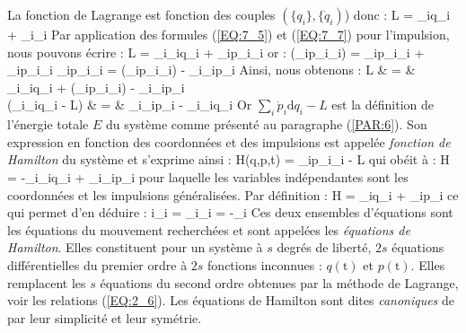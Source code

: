 La fonction de Lagrange est fonction des couples $(\{q_{i}\},\{\dot{q}_{i})$) donc :
\benn
	L = \sum_{i}q_{i} + \sum_{i}_{i}
\eenn
Par application des formules (\ref{EQ:7_5}) et (\ref{EQ:7_7}) pour l'impulsion, nous pouvons \'{e}crire :
\be
	L = \sum_{i}_{i}q_{i} + \sum_{i}p_{i}_{i} \label{EQ:40_1}
\ee
or :
\benn
	\left(\sum_{i}p_{i}_{i}\right) = \sum_{i}p_{i}_{i} + \sum_{i}p_{i}_{i} \Leftrightarrow \sum_{i}p_{i}_{i} = \left(\sum_{i}p_{i}_{i}\right) - \sum_{i}_{i}p_{i}
\eenn
Ainsi, nous obtenons :
\bea
	L & = & \sum_{i}_{i}q_{i} + \left(\sum_{i}p_{i}_{i}\right) - \sum_{i}_{i}p_{i} \nonumber \\
	\Leftrightarrow {}\left(\sum_{i}_{i}q_{i} - L\right) & = & \sum_{i}_{i}p_{i} - \sum_{i}_{i}q_{i} \nonumber
\eea
Or $\sum_{i}\dot{p}_{i}\mathrm{d}q_{i} - L$ est la d\'{e}finition de l'\'{e}nergie totale $E$ du syst\`{e}me comme pr\'{e}sent\'{e} au paragraphe (\ref{PAR:6}). Son expression en fonction des coordonn\'{e}es et des impulsions est appel\'{e}e \emph{fonction de Hamilton} du syst\`{e}me et s'exprime ainsi :
\be
	H(q,p,t) = \sum_{i}p_{i}_{i} - L \label{EQ:40_2}
\ee
qui ob\'{e}it \`{a} :
\be
	H = -\sum_{i}_{i}q_{i} + \sum_{i}_{i}p_{i} \label{EQ:40_3}
\ee
pour laquelle les variables ind\'{e}pendantes sont les coordonn\'{e}es et les impulsions g\'{e}n\'{e}ralis\'{e}es. Par d\'{e}finition :
\benn
	H = \sum_{i}q_{i} + \sum_{i}p_{i}
\eenn
ce qui permet d'en d\'{e}duire :
\be
	\forall i\text{, }_{i} = \sum_{i}_{i} = -\sum_{i} \label{EQ:40_4}
\ee
Ces deux ensembles d'\'{e}quations sont les \'{e}quations du mouvement recherch\'{e}es et sont appel\'{e}es les \emph{\'{e}quations de Hamilton}. Elles constituent pour un syst\`{e}me \`{a} $s$ degr\'{e}s de libert\'{e}, $2s$ \'{e}quations diff\'{e}rentielles du premier ordre \`{a} $2s$ fonctions inconnues : $q(\mathrm{t})$ et $p(\mathrm{t})$. Elles remplacent les $s$ \'{e}quations du second ordre obtenues par la m\'{e}thode de Lagrange, voir les relations (\ref{EQ:2_6}). Les \'{e}quations de Hamilton sont dites \emph{canoniques} de par leur simplicit\'{e} et leur sym\'{e}trie.

